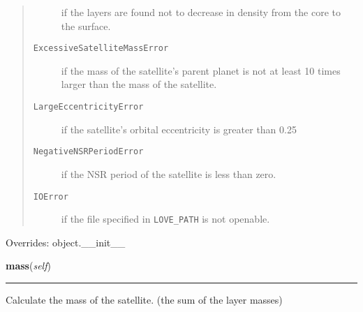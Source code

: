 \begin{boxedminipage}{\funcwidth}
\begin{quote}
\begin{description}
          if the layers are found not to decrease in density from the core 
          to the surface.

          \item[\texttt{ExcessiveSatelliteMassError}]

          if the mass of the satellite's parent planet is not at least 10 
          times larger than the mass of the satellite.

          \item[\texttt{LargeEccentricityError}]

          if the satellite's orbital eccentricity is greater than 0.25

          \item[\texttt{NegativeNSRPeriodError}]

          if the NSR period of the satellite is less than zero.

          \item[\texttt{IOError}]

          if the file specified in \texttt{LOVE\_PATH} is not openable.

        \end{description}

      \end{quote}

      Overrides: object.\_\_init\_\_

    \end{boxedminipage}

    \label{SatStress:SatStress:Satellite:mass}

    \vspace{0.5ex}

\hspace{.8\funcindent}\begin{boxedminipage}{\funcwidth}

    \raggedright \textbf{mass}(\textit{self})

    \vspace{-1.5ex}

    \rule{\textwidth}{0.5\fboxrule}
\setlength{\parskip}{2ex}
    Calculate the mass of the satellite. (the sum of the layer masses)

\setlength{\parskip}{1ex}
    \end{boxedminipage}

    \label{SatStress:SatStress:Satellite:radius}

